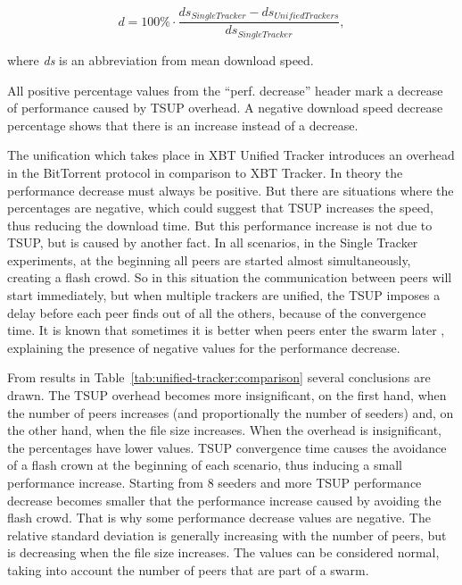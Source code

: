 
\begin{equation}\label{updates-swarmleader}
d = 100\% \cdot \frac{ds_{SingleTracker} - ds_{UnifiedTrackers}}{ds_{SingleTracker}} ,
\end{equation}


where \textit{ds} is an abbreviation from mean download speed.


All positive percentage values from the ``perf. decrease'' header mark a
decrease of performance caused by TSUP overhead. A negative download speed
decrease percentage shows that there is an increase instead of a decrease.

The unification which takes place in XBT Unified Tracker introduces an
overhead in the BitTorrent protocol in comparison to XBT Tracker. In theory
the performance decrease must always be positive. But there are situations
where the percentages are negative, which could suggest that TSUP increases
the speed, thus reducing the download time. But this performance increase is
not due to TSUP, but is caused by another fact. In all scenarios, in the
Single Tracker experiments, at the beginning all peers are started almost
simultaneously, creating a flash crowd. So in this situation the communication
between peers will start immediately, but when multiple trackers are unified,
the TSUP imposes a delay before each peer finds out of all the others, because
of the convergence time.  It is known that sometimes it is better when peers
enter the swarm later \cite{bharambe}, explaining the presence of negative
values for the performance decrease.




From results in Table~\ref{tab:unified-tracker:comparison} several
conclusions are drawn.  The TSUP overhead becomes more insignificant, on the
first hand, when the number of peers increases (and proportionally the number
of seeders) and, on the other hand, when the file size increases. When the
overhead is insignificant, the percentages have lower values. TSUP convergence
time causes the avoidance of a flash crown at the beginning of each scenario,
thus inducing a small performance increase. Starting from 8 seeders and more
TSUP performance decrease becomes smaller that the performance increase caused
by avoiding the flash crowd. That is why some performance decrease values are
negative. The relative standard deviation is generally increasing with the
number of peers, but is decreasing when the file size increases. The values
can be considered normal, taking into account the number of peers that are
part of a swarm.

